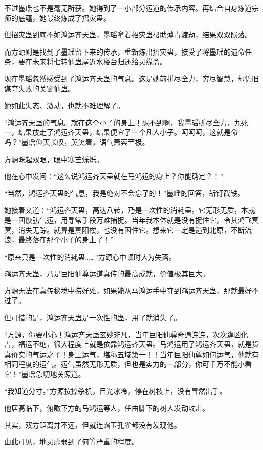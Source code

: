 \begin{this_body}
不过墨瑶也不是毫无所获。她得到了一小部分运道的传承内容。再结合自身炼道宗师的底蕴，她最终炼成了招灾蛊。

但招灾蛊到底不如鸿运齐天蛊，墨瑶拿着招灾蛊帮助薄青渡劫，结果双双陨落。

而方源则是找到了墨瑶留下来的传承，重新炼出招灾蛊，接受了将墨瑶的遗命任务，要在未来将七转仙蛊屋近水楼台归还给灵缘斋。

现在墨瑶忽然感受到了鸿运齐天蛊的气息。这是她前拼尽全力，穷尽智慧，却仍旧谋夺失败的关键仙蛊。

她如此失态、激动，也就不难理解了。

“鸿运齐天蛊的气息。就在这个小子的身上！想不到啊，我墨瑶拼尽全力，九死一，结果放走了鸿运齐天蛊，结果便宜了一个凡人小子。呵呵呵，这就是命吗？”墨瑶仰天长叹，哭笑着，语气萧索至极。

方源眯起双眼，眼中寒芒烁烁。

他在心中发问：“这么说鸿运齐天蛊就在马鸿运的身上？你能确定？！”

“当然，鸿运齐天蛊的气息，我是绝对不会忘了的！”墨瑶的回答，斩钉截铁。

她接着又道：“鸿运齐天蛊，高达八转，乃是一次性的消耗蛊。它无形无质，本就是一团恢弘气运，用寻常手段万难捕捉。当年我本体就是没有捉住它，令其鸿飞冥冥，消失无踪。就算是真阳楼，也没有困住它。想来它一定是逃到北原，不断流浪，最终落在那个小子的身上了！”

“原来只是一次性的消耗蛊……”方源心中顿时大为失落。

鸿运齐天蛊，乃是巨阳仙尊运道真传的最高成就，价值极其巨大。

方源无法在真传秘境中捞好处，如果能从马鸿运手中夺到鸿运齐天蛊，那就最好不过了。

但可惜的是，鸿运齐天蛊是一次性的蛊，用了就消失了。

“方源，你要小心！鸿运齐天蛊玄妙非凡，当年巨阳仙尊奇遇连连，次次逢凶化吉，福运不绝，很大程度上就是依靠鸿运齐天蛊。马鸿运用了鸿运齐天蛊，就是货真价实的气运之子！身上运气，堪称五域第一！！当年巨阳仙尊如何运气，他就有相同程度的运气。运气虽然无形无质，但也是实力的一部分，你可千万不能小看它！”墨瑶急切地关照道。

“我知道分寸。”方源按捺杀机，目光冰冷，停在树枝上，没有冒然出手。

他居高临下，俯瞰下方的马鸿运等人，任由脚下的树人发动攻击。

其实，双方距离并不远，但就连霜玉孔雀都没有发现他。

由此可见，地灵虚弱到了何等严重的程度。


\end{this_body}
